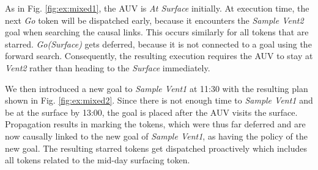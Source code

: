As in Fig. \ref{fig:ex:mixed1}, the AUV is {\em At Surface} initially.
At execution time, the next {\em Go} token will be dispatched
early, because it encounters the {\em Sample Vent2} goal 
when searching the causal links.  This occurs similarly
for all tokens that are starred. {\em Go(Surface)} gets deferred,
because it is not connected to a goal using the forward
search. Consequently, the resulting execution requires the AUV to stay at {\em
  Vent2} rather than heading to the {\em Surface} immediately.


We then introduced a new goal to {\em Sample Vent1} at
11:30 with the resulting plan shown in Fig. \ref{fig:ex:mixed2}. Since
there is not enough time to {\em Sample Vent1} and be at the surface
by 13:00, the goal is placed after the AUV visits the
surface. Propagation results in marking the tokens, which were thus
far deferred and are now causally linked to the new
goal of {\em Sample Vent1}, as having the policy of the new goal. The
resulting starred tokens get dispatched proactively which includes all
tokens related to the mid-day surfacing token.

